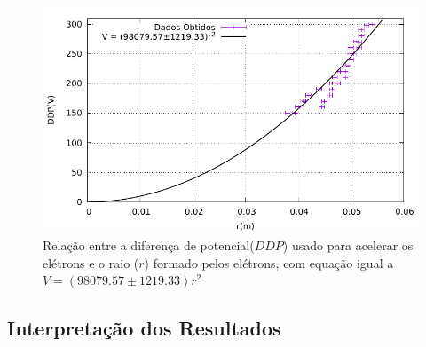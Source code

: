 \begin{figure}[!ht]
	\centering
		\includegraphics[scale= 1.1]{graf/e_m.pdf}
	\caption{Relação entre a diferença de potencial($DDP$) usado para acelerar os elétrons e o raio ($r$) formado pelos elétrons, com equação igual a $V = (98079.57\pm 1219.33)r^2$}
\label{fig}
\end{figure}

\subsection{Interpretação dos Resultados}

